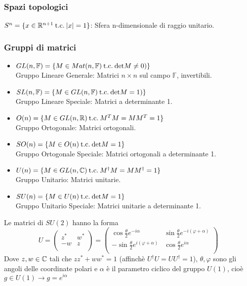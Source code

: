 \subsubsection{Spazi topologici}
$S^n = \{ x \in \mathbb{R}^{n+1} \mathrm{\: t.c. \:} |x| = 1 \}$: Sfera n-dimensionale di raggio unitario.

\subsubsection{Gruppi di matrici}
\begin{itemize}
   \item $GL(n,\mathbb{F}) = \{M \in Mat(n,\mathbb{F}) \mathrm{\: t.c. \:} \mathrm{det} M \neq 0)\}$\\
      \ttab Gruppo Lineare Generale: Matrici $n \times n$ sul campo $\mathbb{F}$,
      invertibili.

   \item $SL(n,\mathbb{F}) = \{ M \in GL(n,\mathbb{F}) \mathrm{\: t.c. \:} \mathrm{det} M = 1)\}$\\
      \ttab Gruppo Lineare Speciale: Matrici a determinante 1.

   \item $O(n) = \{ M \in GL(n,\mathbb{R}) \mathrm{\: t.c. \:}  M^T M = M M^T = 1 \}$\\
      \ttab Gruppo Ortogonale: Matrici ortogonali.

   \item $SO(n) = \{ M \in O(n)\mathrm{\: t.c. \:} \mathrm{det} M  = 1  \}$\\
      \ttab Gruppo Ortogonale Speciale: Matrici ortogonali a determinante 1.

   \item $U(n) = \{ M \in GL(n,\mathbb{C})\mathrm{\: t.c. \:} M^\dagger M = M M^\dagger = 1\}$\\
      \ttab Gruppo Unitario: Matrici unitarie.

   \item $SU(n) = \{ M \in U(n)\mathrm{\: t.c. \:} \mathrm{det}M = 1  \}$\\
      \ttab Gruppo Unitario Speciale: Matrici unitarie a determinante 1.
\end{itemize}

Le matrici di $SU(2)$ hanno la forma
\begin{equation}\label{eq:matSU2}
   U =
        \begin{pmatrix}
          z^* & w^* \\
          -w  & z   \\
        \end{pmatrix}
     =
       \begin{pmatrix}
          \cos \frac{\theta}{2} e^{-i\alpha} & \sin \frac{\theta}{2} e^{-i(\varphi + \alpha)} \\
         -\sin \frac{\theta}{2} e^{i(\varphi + \alpha)} & \cos \frac{\theta}{2} e^{i\alpha}  \\
       \end{pmatrix}
\end{equation}
Dove $z,w \in \mathbb{C}$ tali che $zz^* + ww^* = 1$
(affinchè $U^\dagger U = UU^\dagger = 1$), $\theta,\varphi$ sono gli angoli delle
coordinate polari e $\alpha$ è il parametro ciclico del gruppo $U(1)$, cioè
$g \in U(1) \to g = e^{i\alpha}$

